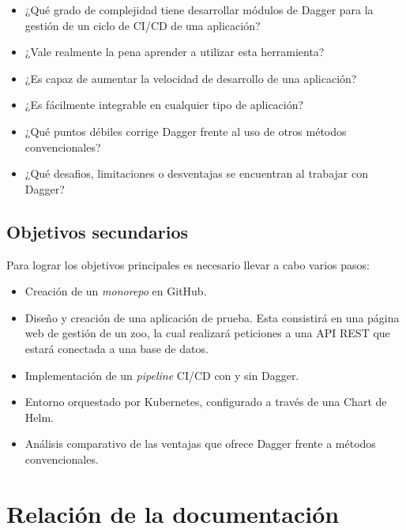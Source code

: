 \begin{itemize}
  \item ¿Qué grado de complejidad tiene desarrollar módulos de Dagger para la gestión de un ciclo de CI/CD de una aplicación?
  \item ¿Vale realmente la pena aprender a utilizar esta herramienta?
  \item ¿Es capaz de aumentar la velocidad de desarrollo de una aplicación?
  \item ¿Es fácilmente integrable en cualquier tipo de aplicación?
  \item ¿Qué puntos débiles corrige Dagger frente al uso de otros métodos convencionales?
  \item ¿Qué desafios, limitaciones o desventajas se encuentran al trabajar con Dagger?
\end{itemize}

\subsection*{Objetivos secundarios}

Para lograr los objetivos principales es necesario llevar a cabo varios pasos:

\begin{itemize}
  \item Creación de un \textit{monorepo}\cite{monorepo} en GitHub.
  \item Diseño y creación de una aplicación de prueba. Esta consistirá en una página web de gestión de un zoo, la cual realizará peticiones a una API REST que estará conectada a una base de datos.
  \item Implementación de un \textit{pipeline} CI/CD con y sin Dagger.
  \item Entorno orquestado por Kubernetes\cite{kubernetes}, configurado a través de una Chart de Helm\cite{helm}.


  \item Análisis comparativo de las ventajas que ofrece Dagger frente a métodos convencionales.
\end{itemize}

\section{Relación de la documentación}


